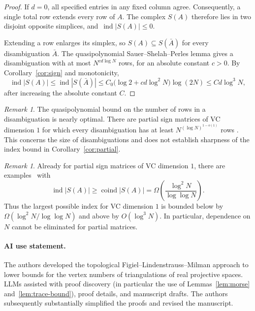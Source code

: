 \documentclass[11pt]{article}
\theoremstyle{remark}
\newtheorem{remark}[theorem]{Remark}
\DeclareMathOperator{\ind}{ind}
\begin{document}
\begin{proof}
If $d=0$, all specified entries in any fixed column agree.
Consequently, a single total row extends every row of $A$.
The complex $S(A)$ therefore lies in two disjoint opposite simplices,
and~$\ind|S(A)|\leq0$.

Extending a row enlarges its simplex, so
$S(A)\subseteq S(\bar A)$ for every disambiguation $\bar A$.
The quasipolynomial Sauer--Shelah--Perles lemma
\cite[Theorem~12]{AHHM} gives a disambiguation with at most
$N^{cd\log N}$ rows, for an absolute constant $c>0$.
By Corollary~\ref{cor:sign} and monotonicity,
\[
 \operatorname{ind}|S(A)|
 \leq\operatorname{ind}|S(\bar A)|
 \leq C_0\bigl(\log 2+cd\log^2 N\bigr)\log(2N)
 \leq C d\log^3 N,
\]
after increasing the absolute constant $C$.
\end{proof}

\begin{remark}
The quasipolynomial bound on the number of rows in a disambiguation
is nearly optimal. There are partial sign matrices of VC dimension
$1$ for which every disambiguation has at least
$N^{(\log N)^{1-o(1)}}$ rows \cite[Theorem~11]{AHHM}.
This concerns the size of disambiguations and does not establish
sharpness of the index bound in Corollary~\ref{cor:partial}.
\end{remark}

\begin{remark}
Already for partial sign matrices of VC dimension $1$, there are
examples~\cite[Proposition~8]{FHV} with
\[
 \operatorname{ind}|S(A)|\geq\operatorname{coind}|S(A)|
 =\Omega\!\left(\frac{\log^2 N}{\log\log N}\right).
\]
Thus the largest possible index for
VC dimension $1$ is bounded below by
$\Omega(\log^2 N/\log\log N)$ and above by $O(\log^3 N)$.
In particular, dependence on $N$ cannot be eliminated for partial
matrices.
\end{remark}

\paragraph{AI use statement.}
The authors developed the topological Figiel--Lindenstrauss--Milman
approach to lower bounds for the vertex numbers of triangulations
of real projective spaces. LLMs assisted with proof discovery (in particular the use of Lemmas~\ref{lem:morse} and~\ref{lem:trace-bound}), proof details, and
manuscript drafts. The authors subsequently substantially
simplified the proofs and revised the manuscript.
\end{document}
